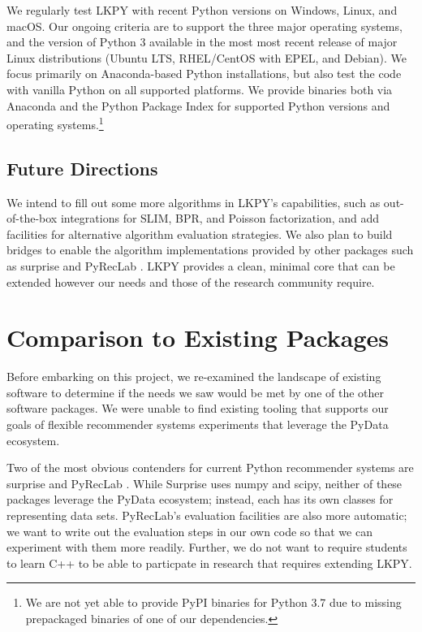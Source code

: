 We regularly test LKPY with recent Python versions on Windows, Linux, and macOS.
Our ongoing criteria are to support the three major operating systems, and the version of Python 3 available in the most most recent release of major Linux distributions (Ubuntu LTS, RHEL/CentOS with EPEL, and Debian).
We focus primarily on Anaconda-based Python installations, but also test the code with vanilla Python on all supported platforms.
We provide binaries both via Anaconda and the Python Package Index for supported Python versions and operating systems.\footnote{We are not yet able to provide PyPI binaries for Python 3.7 due to missing prepackaged binaries of one of our dependencies.}

\subsection{Future Directions}

We intend to fill out some more algorithms in LKPY's capabilities, such as out-of-the-box integrations for SLIM, BPR, and Poisson factorization, and add facilities for alternative algorithm evaluation strategies.
We also plan to build bridges to enable the algorithm implementations provided by other packages such as surprise \citep{Surprise} and PyRecLab \citep{Sepulveda2017-ma}.
LKPY provides a clean, minimal core that can be extended however our needs and those of the research community require.

\section{Comparison to Existing Packages}

Before embarking on this project, we re-examined the landscape of existing software to determine if the needs we saw would be met by one of the other software packages.
We were unable to find existing tooling that supports our goals of flexible recommender systems experiments that leverage the PyData ecosystem.

Two of the most obvious contenders for current Python recommender systems are surprise \citep{Surprise} and PyRecLab \citep{Sepulveda2017-ma}.
While Surprise uses numpy and scipy, neither of these packages leverage the PyData ecosystem; instead, each has its own classes for representing data sets.
PyRecLab's evaluation facilities are also more automatic; we want to write out the evaluation steps in our own code so that we can experiment with them more readily.
Further, we do not want to require students to learn C++ to be able to particpate in research that requires extending LKPY.


